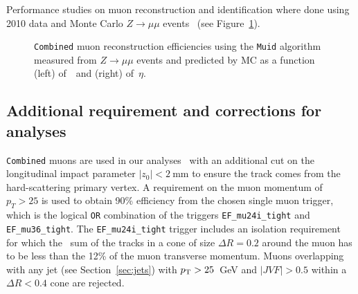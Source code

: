 Performance studies on muon reconstruction and identification where done using 2010 data and Monte
Carlo $Z\to \mu\mu$ events~\cite{ATLAS-CONF-2011-063} (see Figure~\ref{fig:mueff}). 


\begin{figure}[tb]\begin{center}
	\caption{\texttt{Combined} muon reconstruction efficiencies using the \texttt{Muid} algorithm measured from $Z\to \mu\mu$ events and predicted by MC as a function (left) of~\pt\ and (right) of~$\eta$.~\cite{ATLAS-CONF-2011-063}\label{fig:mueff}}
\end{center}\end{figure}


\subsection{Additional requirement and corrections for analyses}

\texttt{Combined} muons are used in our analyses~\cite{topcommon2013} with an additional cut on the longitudinal impact
parameter $|z_0|<2~$mm to ensure the track comes  from the hard-scattering primary vertex.
A requirement on the muon momentum of $p_T>25$ is used to obtain 90\% efficiency from the chosen 
single muon trigger, which is the logical \texttt{OR} combination of the 
triggers \texttt{EF\_mu24i\_tight} and \texttt{EF\_mu36\_tight}. 
The \texttt{EF\_mu24i\_tight} trigger includes an isolation requirement 
for which the \pt\ sum of the tracks in a cone of size $\Delta R=0.2$  around the muon
has to be less than the 12\% of the muon transverse momentum.
Muons overlapping with any jet (see Section~\ref{sec:jets}) with $\pt>25$~GeV and $|JVF|>0.5$ 
within a $\Delta R<0.4$ cone are rejected.

